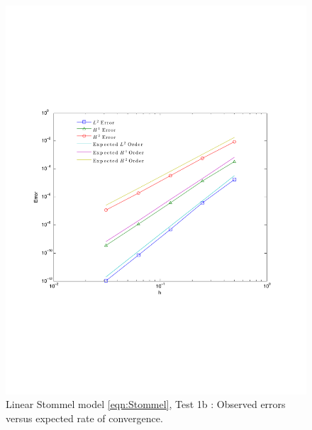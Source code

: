 \begin{figure}
  \begin{center}
    \includegraphics[scale=0.5]{figures/StommelBConvergence.pdf}
    \caption{Linear Stommel model \eqref{eqn:Stommel}, Test 1b \cite{Vallis06}:
      Observed errors versus expected rate of convergence.}
    \label{fig:StommelErrorsVallis1}
  \end{center}
\end{figure}

